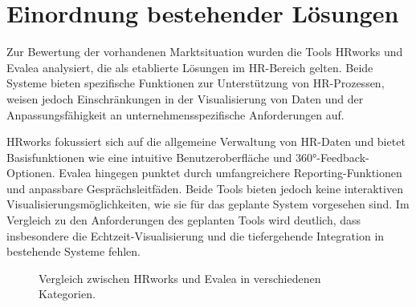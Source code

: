 \section{Einordnung bestehender Lösungen}
Zur Bewertung der vorhandenen Marktsituation wurden die Tools HRworks und Evalea analysiert, die als etablierte Lösungen im HR-Bereich gelten. Beide Systeme bieten spezifische Funktionen zur Unterstützung von HR-Prozessen, weisen jedoch Einschränkungen in der Visualisierung von Daten und der Anpassungsfähigkeit an unternehmensspezifische Anforderungen auf.

HRworks fokussiert sich auf die allgemeine Verwaltung von HR-Daten und bietet Basisfunktionen wie eine intuitive Benutzeroberfläche und 360°-Feedback-Optionen. Evalea hingegen punktet durch umfangreichere Reporting-Funktionen und anpassbare Gesprächsleitfäden. Beide Tools bieten jedoch keine interaktiven Visualisierungsmöglichkeiten, wie sie für das geplante System vorgesehen sind. Im Vergleich zu den Anforderungen des geplanten Tools wird deutlich, dass insbesondere die Echtzeit-Visualisierung und die tiefergehende Integration in bestehende Systeme fehlen.

\begin{figure}[h!]
    \centering
    \caption{Vergleich zwischen HRworks und Evalea in verschiedenen Kategorien.}
    \label{fig:hrworks_evalea_comparison}
\end{figure}

